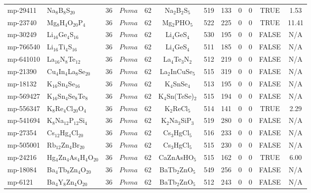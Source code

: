 {\begin{longtable}{llcccccccccc}
    mp-29411 & Na$_{8}$B$_{8}$S$_{20}$ & 36    & $Pnma$ & 62    & Na$_{2}$B$_{2}$S$_{5}$ & 519   & 133   & 0     & 0     & TRUE  & 1.53  \\
    mp-23740 & Mg$_{8}$H$_{4}$O$_{20}$P$_{4}$ & 36    & $Pnma$ & 62    & Mg$_{2}$PHO$_{5}$ & 522   & 225   & 0     & 0     & TRUE  & 11.41  \\
    mp-30249 & Li$_{16}$Ge$_{4}$S$_{16}$ & 36    & $Pnma$ & 62    & Li$_{4}$GeS$_{4}$ & 530   & 195   & 0     & 0     & FALSE & N/A \\
    mp-766540 & Li$_{16}$Ti$_{4}$S$_{16}$ & 36    & $Pnma$ & 62    & Li$_{4}$GeS$_{4}$ & 511   & 185   & 0     & 0     & FALSE & N/A \\
    mp-641010 & La$_{16}$N$_{8}$Te$_{12}$ & 36    & $Pnma$ & 62    & La$_{4}$Te$_{3}$N$_{2}$ & 512   & 219   & 0     & 0     & FALSE & N/A \\
    mp-21390 & Cu$_{4}$In$_{4}$La$_{8}$Se$_{20}$ & 36    & $Pnma$ & 62    & La$_{2}$InCuSe$_{5}$ & 515   & 319   & 0     & 0     & FALSE & N/A \\
    mp-18132 & K$_{16}$Sn$_{4}$Se$_{16}$ & 36    & $Pnma$ & 62    & K$_{4}$SnSe$_{4}$ & 513   & 195   & 0     & 0     & FALSE & N/A \\
    mp-569427 & K$_{16}$Sn$_{4}$Se$_{8}$Te$_{8}$ & 36    & $Pnma$ & 62    & K$_{4}$Sn(TeSe)$_{2}$ & 515   & 194   & 0     & 0     & FALSE & N/A \\
    mp-556347 & K$_{8}$Re$_{4}$Cl$_{20}$O$_{4}$ & 36    & $Pnma$ & 62    & K$_{2}$ReCl$_{5}$ & 514   & 141   & 0     & 0     & TRUE  & 2.29  \\
    mp-541694 & K$_{8}$Na$_{12}$P$_{12}$Si$_{4}$ & 36    & $Pnma$ & 62    & K$_{2}$Na$_{3}$SiP$_{3}$ & 519   & 280   & 0     & 0     & FALSE & N/A \\
    mp-27354 & Cs$_{12}$Hg$_{4}$Cl$_{20}$ & 36    & $Pnma$ & 62    & Cs$_{3}$HgCl$_{5}$ & 516   & 233   & 0     & 0     & FALSE & N/A \\
    mp-505001 & Rb$_{12}$Zn$_{4}$Br$_{20}$ & 36    & $Pnma$ & 62    & Cs$_{3}$HgCl$_{5}$ & 515   & 230   & 0     & 0     & FALSE & N/A \\
    mp-24216 & Hg$_{4}$Zn$_{4}$As$_{4}$H$_{4}$O$_{20}$ & 36    & $Pnma$ & 62    & CaZnAsHO$_{5}$ & 515   & 162   & 0     & 0     & TRUE  & 6.00  \\
    mp-18084 & Ba$_{4}$Tb$_{8}$Zn$_{4}$O$_{20}$ & 36    & $Pnma$ & 62    & BaTb$_{2}$ZnO$_{5}$ & 549   & 256   & 0     & 0     & FALSE & N/A \\
    mp-6121 & Ba$_{4}$Y$_{8}$Zn$_{4}$O$_{20}$ & 36    & $Pnma$ & 62    & BaTb$_{2}$ZnO$_{5}$ & 512   & 243   & 0     & 0     & FALSE & N/A \\

\end{longtable}}

